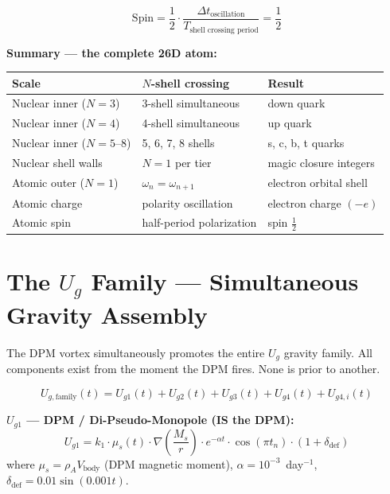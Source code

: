 \documentclass[12pt,a4paper]{article}
\begin{document}
\begin{equation}
  \text{Spin} = \frac{1}{2} \cdot
    \frac{\Delta t_{\text{oscillation}}}{T_{\text{shell crossing period}}} = \frac{1}{2}
  \label{eq:spin_half}
\end{equation}

\noindent\textbf{Summary --- the complete 26D atom:}

\begin{center}
\begin{tabular}{@{}lll@{}}
\toprule
\textbf{Scale} & \textbf{$N$-shell crossing} & \textbf{Result} \\
\midrule
Nuclear inner ($N=3$) & 3-shell simultaneous & down quark \\
Nuclear inner ($N=4$) & 4-shell simultaneous & up quark \\
Nuclear inner ($N=5$--$8$) & 5, 6, 7, 8 shells & s, c, b, t quarks \\
Nuclear shell walls & $N=1$ per tier & magic closure integers \\
Atomic outer ($N=1$) & $\omega_n = \omega_{n+1}$ & electron orbital shell \\
Atomic charge & polarity oscillation & electron charge $(-e)$ \\
Atomic spin & half-period polarization & spin $\frac{1}{2}$ \\
\bottomrule
\end{tabular}
\end{center}

\section{The \texorpdfstring{$U_g$}{Ug} Family --- Simultaneous Gravity Assembly}
\label{sec:ug_family}

The DPM vortex simultaneously promotes the entire $U_g$ gravity family.
All components exist from the moment the DPM fires.  None is prior to another.

\begin{equation}
  U_{g,\text{family}}(t) = U_{g1}(t) + U_{g2}(t) + U_{g3}(t) + U_{g4}(t) + U_{g4,i}(t)
  \label{eq:ug_family}
\end{equation}

\noindent\textbf{$U_{g1}$ --- DPM / Di-Pseudo-Monopole (IS the DPM):}
\begin{equation}
  U_{g1} = k_1 \cdot \mu_s(t) \cdot \nabla\!\left(\frac{M_s}{r}\right)
    \cdot e^{-\alpha t} \cdot \cos(\pi t_n) \cdot (1+\delta_{\text{def}})
  \label{eq:ug1}
\end{equation}
where $\mu_s = \rho_A V_{\text{body}}$ (DPM magnetic moment),
$\alpha = 10^{-3}$~day$^{-1}$, $\delta_{\text{def}} = 0.01\sin(0.001t)$.
\end{document}
